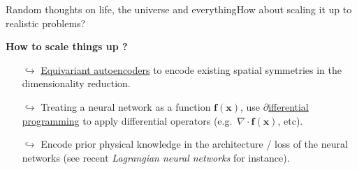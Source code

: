 \begin{frame}[t, c]{Random thoughts on life, the universe and everything}{How about scaling it up to realistic problems?}
  \centering
  \begin{block}
    \Large
    \centering
    \textbf{How to scale things up ?}
  \end{block}
  
  \bigskip
  
  \begin{itemize}
  \item[\(	\hookrightarrow	\)] \underline{Equivariant autoencoders} to encode existing spatial symmetries in the dimensionality reduction.
    
    \medskip
    
  \item[\(	\hookrightarrow	\)] Treating a neural network as a function \( \bm{f}(\bm{x}) \), use \underline{\(\partial\)ifferential programming} to apply differential operators (e.g.\ \( \nabla \cdot \bm{f}(\bm{x}) \), etc).
    
    \medskip
    
  \item[\(	\hookrightarrow	\)] Encode prior physical knowledge in the architecture / loss of the neural networks (see recent \emph{Lagrangian neural networks} for instance).
  \end{itemize}
  
  \vspace{1cm}
\end{frame}
